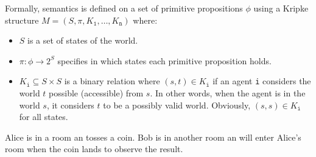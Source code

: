 \begin{description}
        Formally, semantics is defined on a set of primitive propositions $\phi$ 
        using a Kripke structure $M = (S, \pi, K_\texttt{1}, \dots, K_\texttt{n})$ where:
        \begin{itemize}
            \item $S$ is a set of states of the world.
            \item $\pi: \phi \rightarrow 2^S$ specifies in which states each primitive proposition holds.
            \item $K_\texttt{i} \subseteq S \times S$ is a binary relation where 
                $(s, t) \in K_\texttt{i}$ if an agent \texttt{i} considers the world $t$ possible (accessible) from $s$.
                In other words, when the agent is in the world $s$, it considers $t$ to be a possibly valid world.
                Obviously, $(s, s) \in K_\texttt{i}$ for all states.
        \end{itemize}

        \begin{example}
            Alice is in a room an tosses a coin. Bob is in another room an will enter Alice's room when the coin lands to observe the result.


\end{example}
\end{description}
